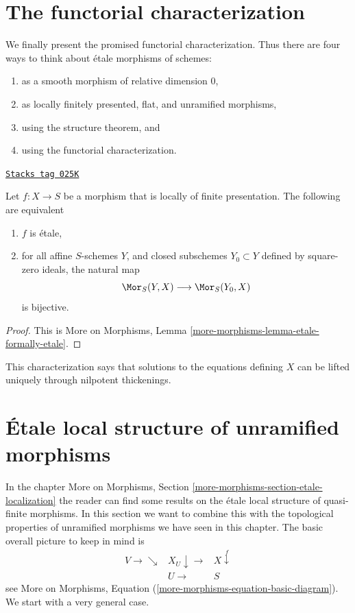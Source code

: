 \section{The functorial characterization}
\label{etale-section-functorial-etale}
We finally present the promised functorial characterization.
Thus there are four ways to think about \'etale morphisms of schemes:
\begin{enumerate}
\item as a smooth morphism of relative dimension $0$,
\item as locally finitely presented, flat, and unramified morphisms,
\item using the structure theorem, and
\item using the functorial characterization.
\end{enumerate}

\begin{theorem}
\label{etale-theorem-formally-etale}
\href{https://stacks.math.columbia.edu/tag/025K}{\texttt{Stacks tag 025K}}

Let $f : X \to S$ be a morphism that is locally of finite presentation.
The following are equivalent
\begin{enumerate}
\item $f$ is \'etale,
\item for all affine $S$-schemes $Y$, and closed subschemes $Y_0 \subset Y$
defined by square-zero ideals, the natural map
$$
\Mor_S(Y, X) \longrightarrow \Mor_S(Y_0, X)
$$
is bijective.
\end{enumerate}
\end{theorem}

\begin{proof}
This is
More on Morphisms, Lemma \ref{more-morphisms-lemma-etale-formally-etale}.
\end{proof}

This characterization says that solutions to the equations defining $X$ can
be lifted uniquely through nilpotent thickenings.

\section{\'Etale local structure of unramified morphisms}
\label{etale-section-unramified-etale-local}
In the chapter
More on Morphisms, Section \ref{more-morphisms-section-etale-localization}
the reader can find some results on the \'etale local structure of
quasi-finite morphisms. In this section we want to combine this
with the topological properties of unramified morphisms we have seen
in this chapter. The basic overall picture to keep in mind is
$$
\begin{array}{ccc}V \longrightarrow\searrow & X_U \downarrow\longrightarrow & X \overset{f}{\downarrow} \\  & U \longrightarrow & S\end{array}
$$
see
More on Morphisms, Equation (\ref{more-morphisms-equation-basic-diagram}).
We start with a very general case.

